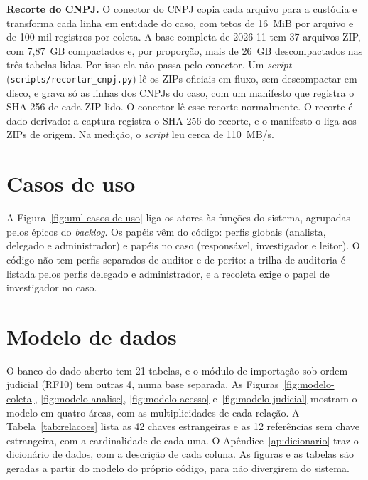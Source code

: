 \textbf{Recorte do CNPJ.} O conector do CNPJ copia cada arquivo para a
custódia e transforma cada linha em entidade do caso, com tetos de 16~MiB por
arquivo e de 100 mil registros por coleta. A base completa de 2026-11 tem 37
arquivos ZIP, com 7,87~GB compactados e, por proporção, mais de 26~GB
descompactados nas três tabelas lidas. Por isso ela não passa pelo conector.
Um \textit{script} (\texttt{scripts/recortar\_cnpj.py}) lê os ZIPs oficiais
em fluxo, sem descompactar em disco, e grava só as linhas dos CNPJs do caso,
com um manifesto que registra o SHA-256 de cada ZIP lido. O conector lê esse
recorte normalmente. O recorte é dado derivado: a captura registra o SHA-256
do recorte, e o manifesto o liga aos ZIPs de origem. Na medição, o
\textit{script} leu cerca de 110~MB/s.

\section{Casos de uso}
\label{sec:desenv-casos-uso}

A Figura~\ref{fig:uml-casos-de-uso} liga os atores às funções do sistema,
agrupadas pelos épicos do \textit{backlog}. Os papéis vêm do código: perfis
globais (analista, delegado e administrador) e papéis no caso (responsável,
investigador e leitor). O código não tem perfis separados de auditor e de
perito: a trilha de auditoria é listada pelos perfis delegado e
administrador, e a recoleta exige o papel de investigador no caso.



\section{Modelo de dados}
\label{sec:desenv-dados}

O banco do dado aberto tem 21 tabelas, e o módulo de importação sob ordem
judicial (RF10) tem outras 4, numa base separada. As
Figuras~\ref{fig:modelo-coleta}, \ref{fig:modelo-analise},
\ref{fig:modelo-acesso} e~\ref{fig:modelo-judicial} mostram o modelo em
quatro áreas, com as multiplicidades de cada relação. A
Tabela~\ref{tab:relacoes} lista as 42 chaves estrangeiras e as 12 referências
sem chave estrangeira, com
a cardinalidade de cada uma. O Apêndice~\ref{ap:dicionario} traz o dicionário
de dados, com a descrição de cada coluna. As figuras e as tabelas são geradas
a partir do modelo do próprio código, para não divergirem do sistema.

